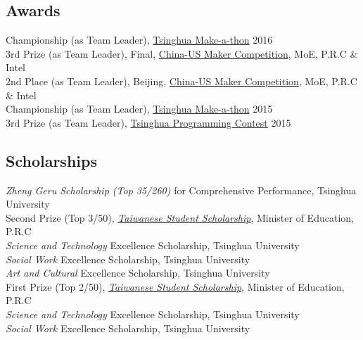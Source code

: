 \documentclass[11pt, a4paper]{article} %
\newcommand{\years}[1]{\marginnote{\scriptsize #1}} %
\begin{document}
\subsection*{Awards}
\years{2016}
Championship (as Team Leader), \href{http://thumaker.cn/blog/2017%E5%88%9B%E5%AE%A2%E6%8C%91%E6%88%98%E8%B5%9B-%E6%8A%A5%E5%90%8D%E4%BB%85%E6%AD%A4%E4%B8%80%E5%91%A8/}{Tsinghua Make-a-thon} 2016\\
\years{2015}
3rd Prize (as Team Leader), Final, \href{https://www.chinaus-maker.org/}{China-US Maker Competition}, MoE, P.R.C \& Intel\\
2nd Place (as Team Leader), Beijing, \href{https://www.chinaus-maker.org/}{China-US Maker Competition}, MoE, P.R.C \& Intel\\
Championship (as Team Leader), \href{http://thumaker.cn/blog/2017%E5%88%9B%E5%AE%A2%E6%8C%91%E6%88%98%E8%B5%9B-%E6%8A%A5%E5%90%8D%E4%BB%85%E6%AD%A4%E4%B8%80%E5%91%A8/}{Tsinghua Make-a-thon} 2015\\
3rd Prize (as Team Leader), \href{https://cpclash.eesast.com/}{Tsinghua Programming Contest} 2015
\subsection*{Scholarships}
\years{2016}
\emph{Zheng Geru Scholarship (Top 35/260)} for Comprehensive Performance, Tsinghua University\\
Second Prize (Top 3/50), \href{http://www.moe.gov.cn/jyb_xxgk/gk_gbgg/moe_0/moe_1133/moe_1134/tnull_14169.html}{\emph{Taiwanese Student Scholarship}}, Minister of Education, P.R.C\\
\emph{Science and Technology} Excellence Scholarship, Tsinghua University\\
\emph{Social Work} Excellence Scholarship, Tsinghua University\\
\emph{Art and Cultural} Excellence Scholarship, Tsinghua University\\
\years{2015} 
First Prize (Top 2/50), \href{http://www.moe.gov.cn/jyb_xxgk/gk_gbgg/moe_0/moe_1133/moe_1134/tnull_14169.html}{\emph{Taiwanese Student Scholarship}}, Minister of Education, P.R.C\\
\emph{Science and Technology} Excellence Scholarship, Tsinghua University\\
\emph{Social Work} Excellence Scholarship, Tsinghua University





\end{document}
